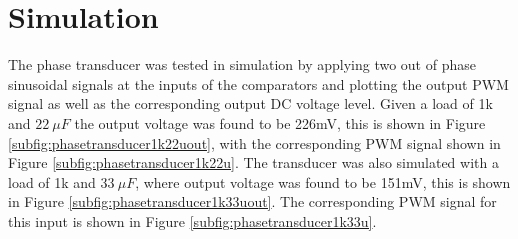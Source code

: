 \section{Simulation} \label{sec:simulation_phasetransducer}
The phase transducer was tested in simulation by applying two out of phase sinusoidal signals at the inputs of the comparators and plotting the output PWM signal as well as the corresponding output DC voltage level. Given a load of 1k and $\SI{22}{\mu F}$ the output voltage was found to be 226mV, this is shown in Figure \ref{subfig:phasetransducer1k22uout}, with the corresponding PWM signal shown in Figure \ref{subfig:phasetransducer1k22u}. The transducer was also simulated with a load of 1k and $\SI{33}{\mu F}$, where output voltage was found to be 151mV, this is shown in Figure \ref{subfig:phasetransducer1k33uout}. The corresponding PWM signal for this input is shown in Figure \ref{subfig:phasetransducer1k33u}. 

